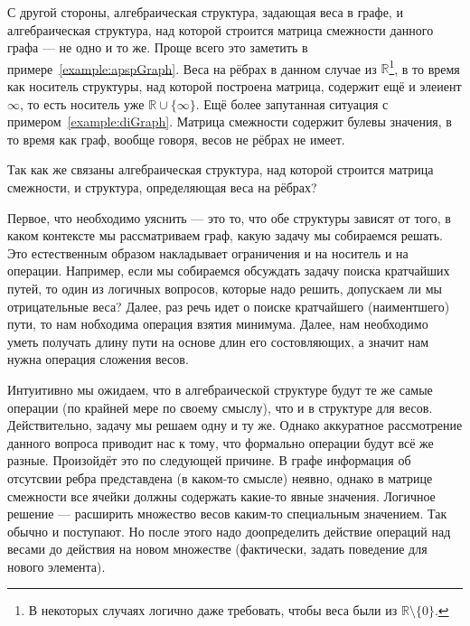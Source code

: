 С другой стороны, алгебраическая структура, задающая веса в графе, и алгебраическая структура, над которой строится матрица смежности данного графа --- не одно и то же. Проще всего это заметить в примере~\ref{example:apspGraph}. Веса на рёбрах в данном случае из $\mathbb{R}$\footnote{В некоторых случаях логично даже требовать, чтобы веса были из $\mathbb{R} \setminus \{0\}$.}, в то время как носитель структуры, над которой построена матрица, содержит ещё и элеиент $\infty$, то есть носитель уже $\mathbb{R}\cup\{\infty\}$. Ещё более запутанная ситуация с примером~\ref{example:diGraph}. Матрица смежности содержит булевы значения, в то время как граф, вообще говоря, весов не рёбрах не имеет.

Так как же связаны алгебраическая структура, над которой строится матрица смежности, и структура, определяющая веса на рёбрах? 

Первое, что необходимо уяснить --- это то, что обе структуры зависят от того, в каком контексте мы рассматриваем граф, какую задачу мы собираемся решать. Это естественным образом накладывает ограничения и на носитель и на операции. Например, если мы собираемся обсуждать задачу поиска кратчайших путей, то один из логичных вопросов, которые надо решить, допускаем ли мы отрицательные веса? Далее, раз речь идет о поиске кратчайшего (наиментшего) пути, то нам нобходима операция взятия минимума. Далее, нам необходимо уметь получать длину пути на основе длин его состовляющих, а значит нам нужна операция сложения весов.

Интуитивно мы ожидаем, что в алгебраической структуре будут те же самые операции (по крайней мере по своему смыслу), что и в структуре для весов. Действительно, задачу мы решаем одну и ту же. Однако аккуратное рассмотрение данного вопроса приводит нас к тому, что формально операции будут всё же разные. Произойдёт это по следующей причине. В графе информация об отсутсвии ребра представдена (в каком-то смысле) неявно, однако в матрице смежности все ячейки должны содержать какие-то явные значения. Логичное решение --- расширить множество весов каким-то специальным значением. Так обычно и поступают. Но после этого надо доопределить действие операций над весами до действия на новом множестве (фактически, задать поведение для нового элемента).

